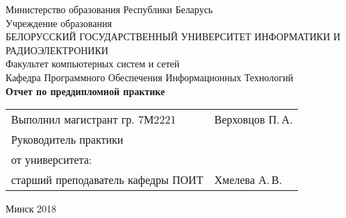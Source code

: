 \begin{titlepage}
    
    \begin{center}
        Министерство образования Республики Беларусь \\[0.4cm] 

        Учреждение образования \\

        \MakeUppercase{БЕЛОРУССКИЙ ГОСУДАРСТВЕННЫЙ УНИВЕРСИТЕТ ИНФОРМАТИКИ И РАДИОЭЛЕКТРОНИКИ} \\[0.4cm]

        Факультет компьютерных систем и сетей \\[0.4cm]

        Кафедра Программного Обеспечения Информационных Технологий \\[3.4cm] %

        {\large\bfseries{Отчет по преддипломной практике}} \\[2cm]
        \begin{tabular}{p{}p{} }
            Выполнил магистрант гр. 7М2221
            & Верховцов П.\,А. \\[1cm]

            Руководитель практики \\
            от университета: \\
            старший преподаватель кафедры ПОИТ
            & Хмелева А.\,В. \\
        \end{tabular}

       \vfill

        {\normalsize Минск 2018}
    \end{center}

\end{titlepage}